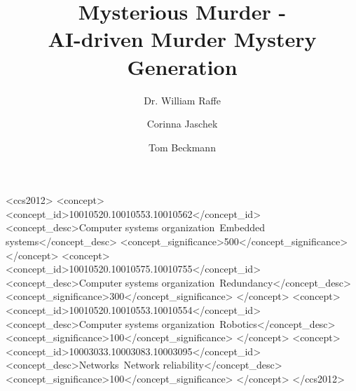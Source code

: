 \documentclass[sigchi,review]{acmart}
\begin{document}
\title{Mysterious Murder -\\
AI-driven Murder Mystery Generation}

\author{Dr. William Raffe}

\author{Corinna Jaschek}

\author{Tom Beckmann}

\renewcommand{\shortauthors}{W. Raffe, C. Jaschek, T. Beckmann}


\begin{abstract}
\end{abstract}

%
%
\begin{CCSXML}
<ccs2012>
 <concept>
  <concept_id>10010520.10010553.10010562</concept_id>
  <concept_desc>Computer systems organization~Embedded systems</concept_desc>
  <concept_significance>500</concept_significance>
 </concept>
 <concept>
  <concept_id>10010520.10010575.10010755</concept_id>
  <concept_desc>Computer systems organization~Redundancy</concept_desc>
  <concept_significance>300</concept_significance>
 </concept>
 <concept>
  <concept_id>10010520.10010553.10010554</concept_id>
  <concept_desc>Computer systems organization~Robotics</concept_desc>
  <concept_significance>100</concept_significance>
 </concept>
 <concept>
  <concept_id>10003033.10003083.10003095</concept_id>
  <concept_desc>Networks~Network reliability</concept_desc>
  <concept_significance>100</concept_significance>
 </concept>
</ccs2012>
\end{CCSXML}



\keywords{}

\maketitle












\listoftodos\relax
\end{document}
